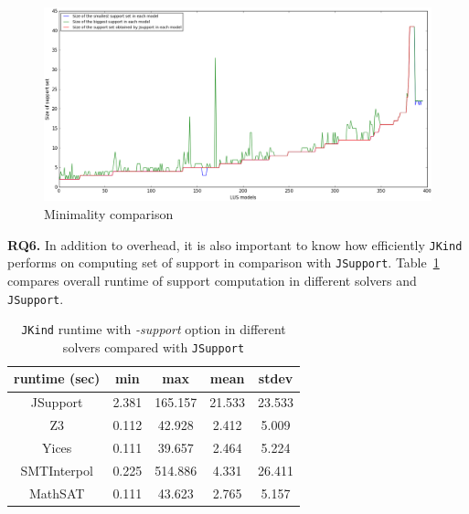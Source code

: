 \begin{figure}
  \centering
  \includegraphics[width=\textwidth]{figs/minimality_analyses.png}
  \caption{\small{Minimality comparison}}\label{fig:minjsup}
\end{figure}

\vspace{6pt}
\noindent{}
 \vspace{9pt}


\textbf{RQ6.} In addition to overhead, it is also important to know how efficiently \texttt{JKind} performs on computing set of support in comparison with \texttt{JSupport}. Table~\ref{tab:eff-comp-jsup} compares overall runtime of support computation in different solvers and \texttt{JSupport}.


\begin{table}
  \centering
  \begin{tabular}{ |c||c|c|c|c| }
    \hline
     runtime (sec) & min & max & mean & stdev \\[0.5ex]
    \hline\hline
    JSupport & 2.381 & 165.157 & 21.533 & 23.533 \\[0.5ex]
    Z3   & 0.112 & 42.928 & 2.412 & 5.009 \\[0.5ex]
    Yices &   0.111  & 39.657   & 2.464 & 5.224 \\[0.5ex]
    SMTInterpol& 0.225 & 514.886 &  4.331 & 26.411 \\[0.5ex]
    MathSAT & 0.111 & 43.623 &  2.765 & 5.157 \\[0.5ex]
    \hline
  \end{tabular}
  \caption{\small{\texttt{JKind} runtime with \emph{-support} option in different solvers compared with \texttt{JSupport}}}
  \label{tab:eff-comp-jsup}
\end{table}


